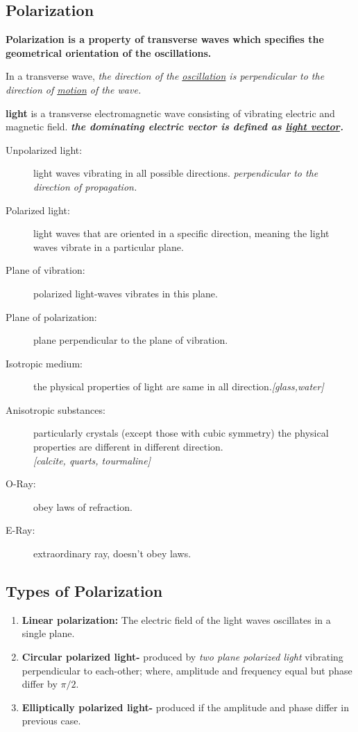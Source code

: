 \documentclass[legalpaper,10pt]{article}
\begin{document}
\begin{multicols*}{2}
	\section*{Polarization}
	\par\textbf{Polarization is a property of transverse waves which specifies the geometrical orientation of the oscillations.}
	\par In a transverse wave, \textit{the direction of the \underline{oscillation} is perpendicular to the direction of \underline{motion} of the wave.} \\

	\par\textbf{light} is a transverse electromagnetic wave consisting of vibrating electric and magnetic field. \textit{\textbf{the dominating electric vector is defined as \underline{light vector}.}}
	
	\begin{description}
		\item[Unpolarized light:]light waves vibrating in all possible directions. \textit{perpendicular to the direction of propagation.}
		\item[Polarized light:] light waves that are oriented in a specific direction, meaning the light waves vibrate in a particular plane.
		\item[Plane of vibration:] polarized light-waves vibrates in this plane.
		\item[Plane of polarization:] plane perpendicular to the plane of vibration.
		\item[Isotropic medium:] the physical properties of light are same in all direction.\textit{[glass,water]}
		\item[Anisotropic substances:] particularly crystals (except those with cubic symmetry) the physical properties are different in different direction. \\\textit{[calcite, quarts, tourmaline]}
		\item[O-Ray:] obey laws of refraction.
		\item[E-Ray:] extraordinary ray, doesn't obey laws.
	\end{description}

	\subsection*{Types of Polarization}
	\begin{enumerate}
		\item \textbf{Linear polarization:} The electric field of the light waves oscillates in a single plane.
		\item \textbf{Circular polarized light-} produced by \textit{two plane polarized light} vibrating perpendicular to each-other; where, amplitude and frequency equal but phase differ by $ \pi/2 $.
		\item \textbf{Elliptically polarized light-} produced if the amplitude and phase differ in previous case.
	\end{enumerate}


\end{multicols*}
\end{document}
